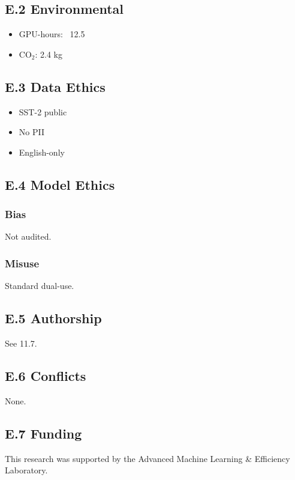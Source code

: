 \subsection{E.2 Environmental}

\begin{itemize}
\item GPU-hours: ~12.5
\item CO$_2$: 2.4 kg

\end{itemize}
\subsection{E.3 Data Ethics}

\begin{itemize}
\item SST-2 public
\item No PII
\item English-only

\end{itemize}
\subsection{E.4 Model Ethics}

\subsubsection{Bias}
Not audited.

\subsubsection{Misuse}
Standard dual-use.

\subsection{E.5 Authorship}

See  11.7.

\subsection{E.6 Conflicts}

None.

\subsection{E.7 Funding}

This research was supported by the Advanced Machine Learning \& Efficiency Laboratory.


